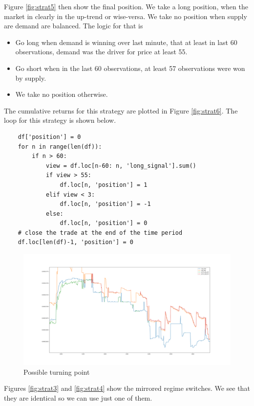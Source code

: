 \documentclass[12pt]{article}
\begin{document}
Figure \ref{fig:strat5} then show the final position. We take a long position, when the market in clearly in the up-trend or wise-versa. We take no position when supply are demand are balanced. The logic for that is

\begin{itemize}
\item Go long when demand is winning over last minute, that at least in last 60 observations, demand was the driver for price at least 55.
\item Go short when in the last 60 observations, at least 57 observations were won by supply.
\item We take no position otherwise.
\end{itemize}
The cumulative returns for this strategy are plotted in Figure \ref{fig:strat6}. The loop for this strategy is shown below.
\pagebreakprint
\begin{verbatim}
    df['position'] = 0
    for n in range(len(df)):
        if n > 60:
            view = df.loc[n-60: n, 'long_signal'].sum()
            if view > 55:
                df.loc[n, 'position'] = 1
            elif view < 3:
                df.loc[n, 'position'] = -1
            else:
                df.loc[n, 'position'] = 0
    # close the trade at the end of the time period
    df.loc[len(df)-1, 'position'] = 0
\end{verbatim}
\FloatBarrier
\begin{figure}[h!]
	\centering
  \includegraphics[width=\textwidth]{strategy2.png}
  \caption{Possible turning point}
  \label{fig:strat2}
\end{figure}
Figures \ref{fig:strat3} and \ref{fig:strat4} show the mirrored regime switches. We see that they are identical so we can use just one of them.
\end{document}
